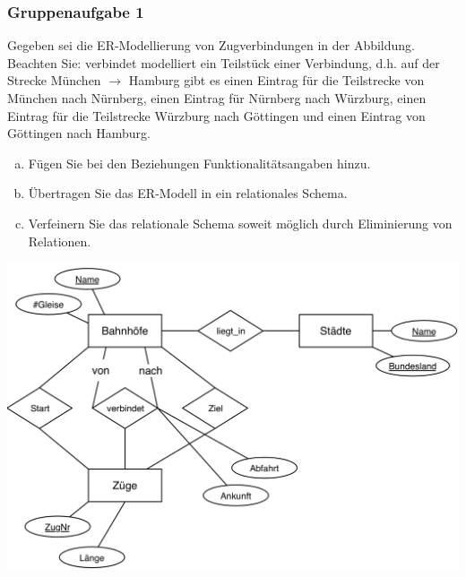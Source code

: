 \begin{frame}
	\frametitle{Gruppenaufgabe 1}
	\vspace{0.25cm}

	\begin{multicols}{2}
		Gegeben sei die ER-Modellierung von Zugverbindungen in der Abbildung.
		Beachten Sie: verbindet modelliert ein Teilstück einer Verbindung,
		d.h. auf der Strecke München \( \rightarrow \) Hamburg gibt es einen Eintrag für
		die Teilstrecke von München nach Nürnberg,
		einen Eintrag für Nürnberg nach Würzburg,
		einen Eintrag für die Teilstrecke Würzburg nach Göttingen und einen Eintrag von Göttingen nach Hamburg.
		\begin{enumerate}[a)]
			\item<1-> Fügen Sie bei den Beziehungen Funktionalitätsangaben hinzu.
			\item<2-> Übertragen Sie das ER-Modell in ein relationales Schema.
			\item<3-> Verfeinern Sie das relationale Schema soweit möglich durch Eliminierung von Relationen.
		\end{enumerate}

		\vfill\columnbreak
		\begin{center}
			\includegraphics[height=.5\paperheight]{./er_modell1.png}
		\end{center}
	\end{multicols}
\end{frame}


